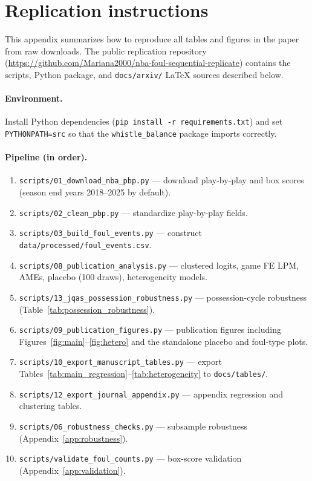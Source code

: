 \section{Replication instructions}
\label{app:replication:code}

This appendix summarizes how to reproduce all tables and figures in the paper from raw downloads. The public replication repository (\url{https://github.com/Mariana2000/nba-foul-sequential-replicate}) contains the scripts, Python package, and \texttt{docs/arxiv/} LaTeX sources described below.

\paragraph{Environment.}
Install Python dependencies (\texttt{pip install -r requirements.txt}) and set \texttt{PYTHONPATH=src} so that the \texttt{whistle\_balance} package imports correctly.

\paragraph{Pipeline (in order).}
\begin{enumerate}
  \item \texttt{scripts/01\_download\_nba\_pbp.py} --- download play-by-play and box scores (season end years 2018--2025 by default).
  \item \texttt{scripts/02\_clean\_pbp.py} --- standardize play-by-play fields.
  \item \texttt{scripts/03\_build\_foul\_events.py} --- construct \texttt{data/processed/foul\_events.csv}.
  \item \texttt{scripts/08\_publication\_analysis.py} --- clustered logits, game FE LPM, AMEs, placebo (100 draws), heterogeneity models.
  \item \texttt{scripts/13\_jqas\_possession\_robustness.py} --- possession-cycle robustness (Table~\ref{tab:possession_robustness}).
  \item \texttt{scripts/09\_publication\_figures.py} --- publication figures including Figures~\ref{fig:main}--\ref{fig:hetero} and the standalone placebo and foul-type plots.
  \item \texttt{scripts/10\_export\_manuscript\_tables.py} --- export Tables~\ref{tab:main_regression}--\ref{tab:heterogeneity} to \texttt{docs/tables/}.
  \item \texttt{scripts/12\_export\_journal\_appendix.py} --- appendix regression and clustering tables.
  \item \texttt{scripts/06\_robustness\_checks.py} --- subsample robustness (Appendix~\ref{app:robustness}).
  \item \texttt{scripts/validate\_foul\_counts.py} --- box-score validation (Appendix~\ref{app:validation}).
\end{enumerate}

